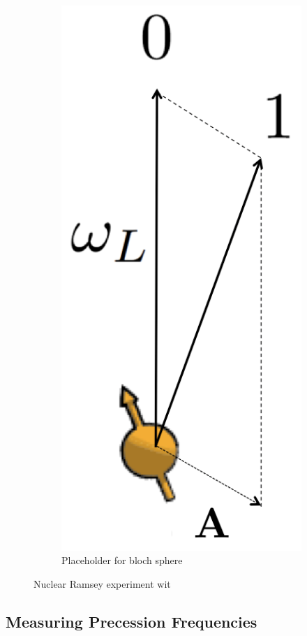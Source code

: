 \begin{figure}[htbp]
\begin{subfigure}[t]{0.32\textwidth}
        \includegraphics[scale=0.2]{Img/QuantizationAxis.png}
        \caption{Placeholder for bloch sphere }
    \end{subfigure}
    \caption{Nuclear Ramsey experiment wit}
    \label{fig:conditional_pm_x_rotation}
\end{figure}



\subsection*{Measuring Precession Frequencies}






